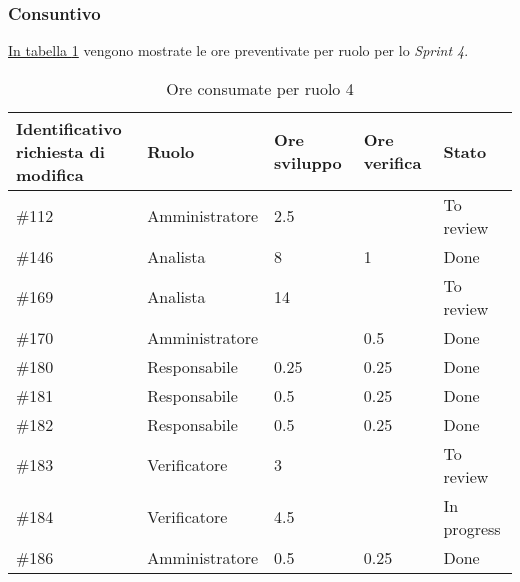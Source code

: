 \subsubsection{Consuntivo}

\hyperref[tab:sprint4_ore_consumate]{In tabella \ref{tab:sprint4_ore_consumate}} vengono mostrate le ore preventivate per ruolo per lo \textit{Sprint 4}.

\begin{table}[H]
    \centering
    \begin{tabular}{| l | l | l | l | l |}
        \hline
            \makecell{\textbf{Identificativo} \\ \textbf{richiesta di modifica}} &
            \textbf{Ruolo} & 
            \textbf{Ore sviluppo} &
            \textbf{Ore verifica} & 
            \textbf{Stato}\\ 
        \hline
            \#112 & Amministratore & 2.5 & & To review\\
        \hline
            \#146 & Analista & 8 & 1 & Done\\
        \hline
            \#169 & Analista & 14 &  & To review\\
        \hline
            \#170 & Amministratore &  & 0.5 & Done \\
        \hline
            \#180 & Responsabile & 0.25 & 0.25 & Done\\
        \hline
            \#181 & Responsabile & 0.5 & 0.25 & Done\\
        \hline
            \#182 & Responsabile & 0.5 & 0.25 & Done\\
        \hline
            \#183 & Verificatore & 3 &  & To review\\
        \hline
            \#184 & Verificatore & 4.5 &  & In progress\\
        \hline
            \#186 & Amministratore & 0.5 & 0.25 & Done\\
        \hline
    \end{tabular}
    \caption{Ore consumate per ruolo  4}
    \label{tab:sprint4_ore_consumate} 
\end{table}